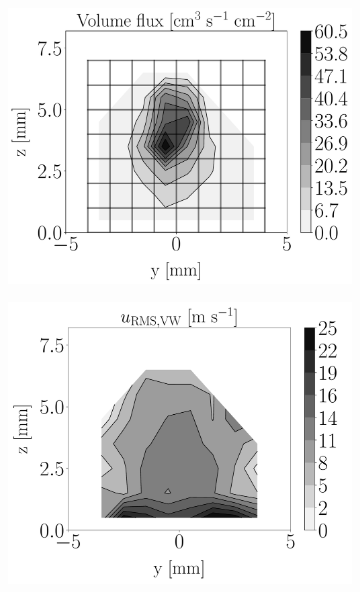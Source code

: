 \begin{figure}[h!]
\vspace*{-0.20in}

\flushleft
\begin{subfigure}[b]{0.2\textwidth}
	\flushleft
	\hspace*{-0.45in}
   \includegraphics[scale=0.19]{./part2_developments/figures_ch6_lagrangian_JICF/injectors_SLI/uG100_dx10_x05_volume_flux_map}
\end{subfigure}
\hspace*{0.075in}
\begin{subfigure}[b]{0.2\textwidth}
	\flushleft
   \includegraphics[scale=0.19]{./part2_developments/figures_ch6_lagrangian_JICF/injectors_SLI/uG100_dx10_x05_ux_RMS_vw_map}

\end{subfigure}
\end{figure}
